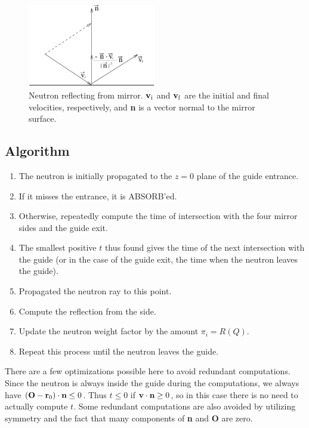 \begin{figure}
  \begin{center}
    \includegraphics[width=0.5\textwidth]{figures/guide2}
  \end{center}
\caption{Neutron reflecting from mirror. ${\bf v}_{\rm i}$ and
${\bf v}_{\rm f}$ are the initial and final velocities, respectively,
and {\bf n} is a vector normal to the mirror surface.}
\label{f:guidereflect}
\end{figure}

\subsection{Algorithm}
\begin{enumerate}
\item The neutron is initially propagated to the $z = 0$ plane of the
guide entrance.
\item If it misses the entrance, it is ABSORB'ed.
\item Otherwise, repeatedly compute the time of intersection with the
four mirror sides and the guide exit.
\item The smallest positive $t$ thus
found gives the time of the next intersection with the guide (or in the
case of the guide exit, the time when the neutron leaves the guide).
\item Propagated the neutron ray to this point.
\item Compute the reflection from the side.
\item Update the neutron weight factor by the amount $\pi_i = R(Q)$.
\item Repeat this process until the neutron leaves the guide.
\end{enumerate}

There are a few optimizations possible here to avoid redundant
computations. Since the neutron is always inside the guide during the
computations, we always have
$({\bf O} - {\bf r}_0) \cdot {\bf n} \leq 0$.
Thus $t \leq 0$ if ${\bf v} \cdot {\bf n} \geq 0$, so in this case
there is no need to actually compute $t$. Some redundant computations
are also avoided by utilizing symmetry and the fact that many
components of {\bf n} and {\bf O} are zero.

